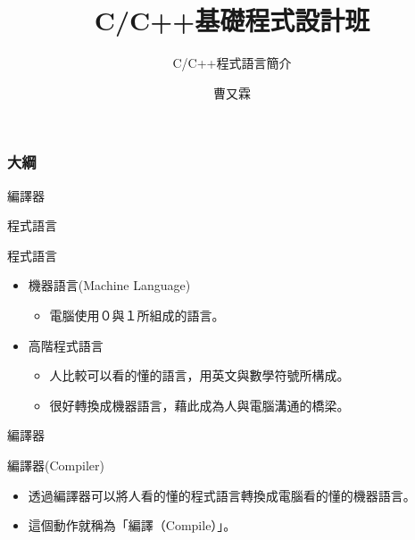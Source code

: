 \documentclass[pdf,15pt]{beamer}
\title{C/C++基礎程式設計班}
\subtitle{C/C++程式語言簡介}
\author{曹又霖}
\begin{document}
\begin{frame}
\titlepage
\end{frame}

\begin{frame}
\frametitle{大綱} %
\tableofcontents %
\end{frame}

\begin{section}{編譯器}
\begin{subsection}{程式語言}
\begin{frame}{程式語言}
\begin{itemize}
\item 機器語言(Machine Language)
  \begin{itemize}
  \item 電腦使用０與１所組成的語言。
  \end{itemize}
  \item 高階程式語言
  \begin{itemize}
  \item 人比較可以看的懂的語言，用英文與數學符號所構成。
  \item 很好轉換成機器語言，藉此成為人與電腦溝通的橋梁。
  \end{itemize}
  \end{itemize}
  \end{frame}
  \end{subsection}

  \begin{subsection}{編譯器}
  \begin{frame}{編譯器(Compiler)}
  \begin{itemize}
  \item 透過編譯器可以將人看的懂的程式語言轉換成電腦看的懂的機器語言。
  \item 這個動作就稱為「編譯（Compile）」。
  \end{itemize}

  \end{frame}
  \end{subsection}


  \end{section}

  
\end{document}
